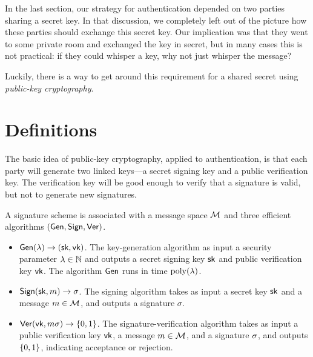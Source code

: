 In the last section, our strategy for
authentication depended on two parties sharing a
secret key.
In that discussion, we completely left
out of the picture how these parties should
exchange this secret key.
Our implication was that they
went to some private room and exchanged the key in
secret, but in many cases this is not practical:
if they could whisper a key, why not just whisper the message?

Luckily, there is a way to get around this requirement for a shared secret using \emph{public-key cryptography}.\cite{DH76} %

\section{Definitions}
The basic idea of public-key cryptography, applied
to authentication, is that each party will
generate two linked keys---a secret signing key
and a public verification key.
The verification key will be good enough to verify that a signature
is valid, but not to generate new signatures.

\begin{definition}
	A signature scheme is associated with a message space $\mathcal{M}$ and three efficient algorithms $(\mathsf{Gen}, \mathsf{Sign}, \mathsf{Ver})$.

	\begin{itemize}
    \item $\mathsf{Gen}(\lambda) \to ({\mathsf{sk}}, \mathsf{vk})$.
      The key-generation algorithm as input a security parameter $\lambda \in \mathbb{N}$ and outputs a secret signing key ${\mathsf{sk}}$ and public verification key $\mathsf{vk}$.
      The algorithm $\mathsf{Gen}$ runs in time $\operatorname{poly}(\lambda)$.
    \item $\mathsf{Sign}({\mathsf{sk}}, m) \to \sigma$.
      The signing algorithm takes as input a secret key ${\mathsf{sk}}$ and a message $m \in \mathcal{M}$, and outputs a signature $\sigma$.
    \item $\mathsf{Ver}(\mathsf{vk}, m \sigma) \to \{0,1\}$.
      The signature-verification algorithm takes as input a public verification key $\mathsf{vk}$, a message $m \in \mathcal{M}$, and a signature $\sigma$, 
      and outputs $\{0,1\}$, indicating acceptance or rejection.
	\end{itemize}
	
\end{definition}

